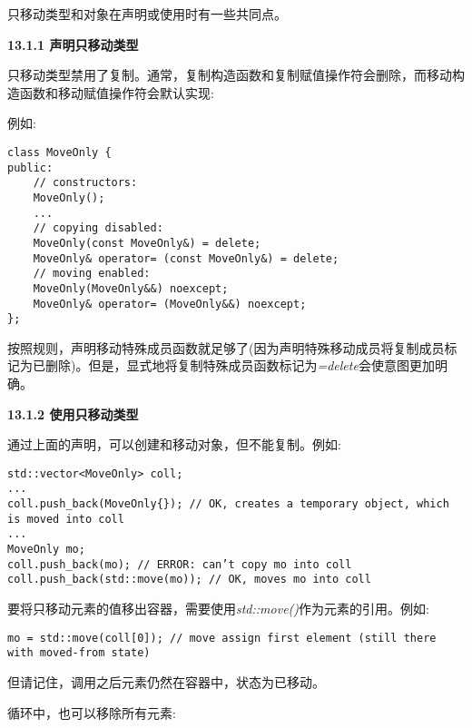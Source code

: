 只移动类型和对象在声明或使用时有一些共同点。\par

\hspace*{\fill} \par %
\textbf{13.1.1 声明只移动类型}

只移动类型禁用了复制。通常，复制构造函数和复制赋值操作符会删除，而移动构造函数和移动赋值操作符会默认实现:\par

例如:\par

\begin{lstlisting}[caption={}]
class MoveOnly {
public:
	// constructors:
	MoveOnly();
	...
	// copying disabled:
	MoveOnly(const MoveOnly&) = delete;
	MoveOnly& operator= (const MoveOnly&) = delete;
	// moving enabled:
	MoveOnly(MoveOnly&&) noexcept;
	MoveOnly& operator= (MoveOnly&&) noexcept;
};
\end{lstlisting}

按照规则，声明移动特殊成员函数就足够了(因为声明特殊移动成员将复制成员标记为已删除)。但是，显式地将复制特殊成员函数标记为\textit{=delete}会使意图更加明确。\par

\hspace*{\fill} \par %
\textbf{13.1.2 使用只移动类型}

通过上面的声明，可以创建和移动对象，但不能复制。例如:\par

\begin{lstlisting}[caption={}]
std::vector<MoveOnly> coll;
...
coll.push_back(MoveOnly{}); // OK, creates a temporary object, which is moved into coll
...
MoveOnly mo;
coll.push_back(mo); // ERROR: can’t copy mo into coll
coll.push_back(std::move(mo)); // OK, moves mo into coll
\end{lstlisting}

要将只移动元素的值移出容器，需要使用\textit{std::move()}作为元素的引用。例如:\par

\begin{lstlisting}[caption={}]
mo = std::move(coll[0]); // move assign first element (still there with moved-from state)
\end{lstlisting}

但请记住，调用之后元素仍然在容器中，状态为已移动。\par

循环中，也可以移除所有元素:\par

